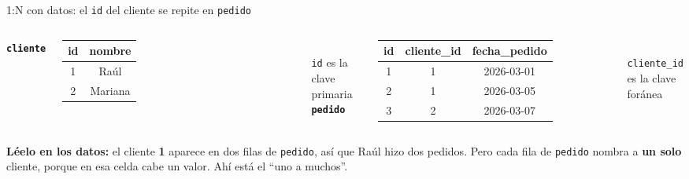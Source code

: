 \documentclass[aspectratio=169,10pt,c]{beamer}
\begin{document}
\begin{frame}{1:N con datos: el \texttt{id} del cliente se repite en \texttt{pedido}}
\begin{columns}[T,onlytextwidth]
\centering
\footnotesize\texttt{\textbf{cliente}}\\[4pt]
\begin{tabular}{cc}
\toprule
\bfseries id & \bfseries nombre \\
\midrule
1 & Raúl \\
2 & Mariana \\
\bottomrule
\end{tabular}\\[3pt]
{\scriptsize \texttt{id} es la clave primaria}
\centering
\footnotesize\texttt{\textbf{pedido}}\\[4pt]
\begin{tabular}{ccc}
\toprule
\bfseries id & \bfseries cliente\_id & \bfseries fecha\_pedido \\
\midrule
1 & 1 & 2026-03-01 \\
2 & 1 & 2026-03-05 \\
3 & 2 & 2026-03-07 \\
\bottomrule
\end{tabular}\\[3pt]
{\scriptsize \texttt{cliente\_id} es la clave foránea}
\end{columns}
\vspace{0.4cm}
\small \textbf{Léelo en los datos:} el cliente \textbf{1} aparece en dos filas de \texttt{pedido}, así que Raúl hizo dos pedidos. Pero cada fila de \texttt{pedido} nombra a \textbf{un solo} cliente, porque en esa celda cabe un valor. Ahí está el ``uno a muchos''.
\end{frame}
\end{document}
